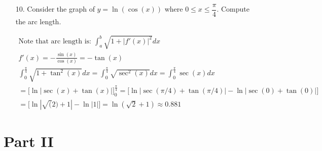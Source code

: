 \begin{itemize}
        \item [10.] Consider the graph of $y=\ln(\cos(x))$ where $0 \leq x \leq \dfrac{\pi}{4}$. Compute the arc length.
        \\
        \begin{mdframed}
            \begin{center}
            \end{center}

            \begin{equation*}
                \begin{gathered}
                    \text{Note that arc length is: } \int_{a}^{b}\sqrt{1+|f'(x)|^{2}}dx \\
                    f'(x) = -\frac{\sin(x)}{\cos(x)} = -\tan(x)                         \\
                    \int_{0}^{\frac{\pi}{4}}\sqrt{1+\tan^{2}(x)}dx = 
                    \int_{0}^{\frac{\pi}{4}}\sqrt{\sec^{2}(x)}dx =
                    \int_{0}^{\frac{\pi}{4}}\sec(x)dx                                   \\
                    = \Big[\ln|\sec(x)+\tan(x)|\Big]_{0}^{\frac{\pi}{4}} =
                    \Big[\ln|\sec(\pi/4)+\tan(\pi/4)| - \ln|\sec(0)+\tan(0)|\Big]       \\
                    = \Big[\ln|\sqrt(2)+1| - \ln|1|\Big] = \ln\left(\sqrt{2}+1\right) \approx \boxed{0.881}
                \end{gathered}
            \end{equation*}
        \end{mdframed}
    \end{itemize}

    \pagebreak

    \section*{Part II}

